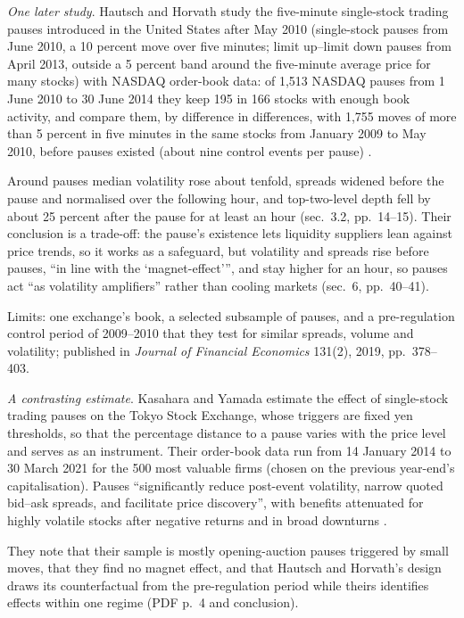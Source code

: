 \begin{qfmechanism}
\emph{One later study}. Hautsch and Horvath study the five-minute single-stock trading pauses introduced in the United States after May 2010 (single-stock pauses from June 2010, a 10 percent move over five minutes; limit up--limit down pauses from April 2013, outside a 5 percent band around the five-minute average price for many stocks) with NASDAQ order-book data: of 1{,}513 NASDAQ pauses from 1 June 2010 to 30 June 2014 they keep 195 in 166 stocks with enough book activity, and compare them, by difference in differences, with 1{,}755 moves of more than 5 percent in five minutes in the same stocks from January 2009 to May 2010, before pauses existed (about nine control events per pause) \citep[CFS Working Paper 571, April 2017 draft, secs.~2.2, 3.1 and~4, pp.~7--17]{hautsch-horvath-2017}.

Around pauses median volatility rose about tenfold, spreads widened before the pause and normalised over the following hour, and top-two-level depth fell by about 25 percent after the pause for at least an hour (sec.~3.2, pp.~14--15). Their conclusion is a trade-off: the pause's existence lets liquidity suppliers lean against price trends, so it works as a safeguard, but volatility and spreads rise before pauses, ``in line with the `magnet-effect''', and stay higher for an hour, so pauses act ``as volatility amplifiers'' rather than cooling markets (sec.~6, pp.~40--41).

Limits: one exchange's book, a selected subsample of pauses, and a pre-regulation control period of 2009--2010 that they test for similar spreads, volume and volatility; published in \emph{Journal of Financial Economics} 131(2), 2019, pp.~378--403.

\emph{A contrasting estimate}. Kasahara and Yamada estimate the effect of single-stock trading pauses on the Tokyo Stock Exchange, whose triggers are fixed yen thresholds, so that the percentage distance to a pause varies with the price level and serves as an instrument. Their order-book data run from 14 January 2014 to 30 March 2021 for the 500 most valuable firms (chosen on the previous year-end's capitalisation). Pauses ``significantly reduce post-event volatility, narrow quoted bid--ask spreads, and facilitate price discovery'', with benefits attenuated for highly volatile stocks after negative returns and in broad downturns \citep[JPX Working Paper Vol.~52, 10 April 2026, abstract and sec.~3, PDF pp.~3--8]{jpx-wp-52-2026}.

They note that their sample is mostly opening-auction pauses triggered by small moves, that they find no magnet effect, and that Hautsch and Horvath's design draws its counterfactual from the pre-regulation period while theirs identifies effects within one regime (PDF p.~4 and conclusion).


\end{qfmechanism}
